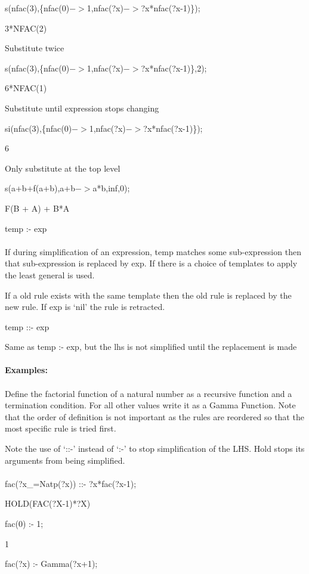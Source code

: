  s(nfac(3),\{nfac(0)$->$1,nfac(?x)$->$?x{*}nfac(?x-1)\});

 3{*}NFAC(2)


Substitute twice

 s(nfac(3),\{nfac(0)$->$1,nfac(?x)$->$?x{*}nfac(?x-1)\},2);

 6{*}NFAC(1)


Substitute until expression stops changing

 si(nfac(3),\{nfac(0)$->$1,nfac(?x)$->$?x{*}nfac(?x-1)\});

 6


Only substitute at the top level

 s(a+b+f(a+b),a+b$->$a{*}b,inf,0);

 F(B + A) + B{*}A


temp :- exp \\
\ \\
If during simplification of an expression, temp matches some
sub-expression then that sub-expression is replaced by exp. If there is
a choice of templates to apply the least general is used.

If a old rule exists with the same template then the old rule is
replaced by the new rule. If exp is `nil' the rule is retracted.



temp ::- exp


Same as temp :- exp, but the lhs is not simplified until the replacement
is made \\
\ \\
{\bf Examples:} \\
\ \\
Define the factorial function of a natural number as a recursive function
and a termination condition. For all other values write it as a Gamma
Function. Note that the order of definition is not important as the rules
are reordered so that the most specific rule is tried first.

Note the use of `::-' instead of `:-' to stop simplification of
the LHS. Hold stops its arguments from being simplified. \\
\ \\
 fac(?x\_=Natp(?x)) ::- ?x{*}fac(?x-1);

 HOLD(FAC(?X-1){*}?X)



 fac(0) :- 1;

 1



 fac(?x) :- Gamma(?x+1);

